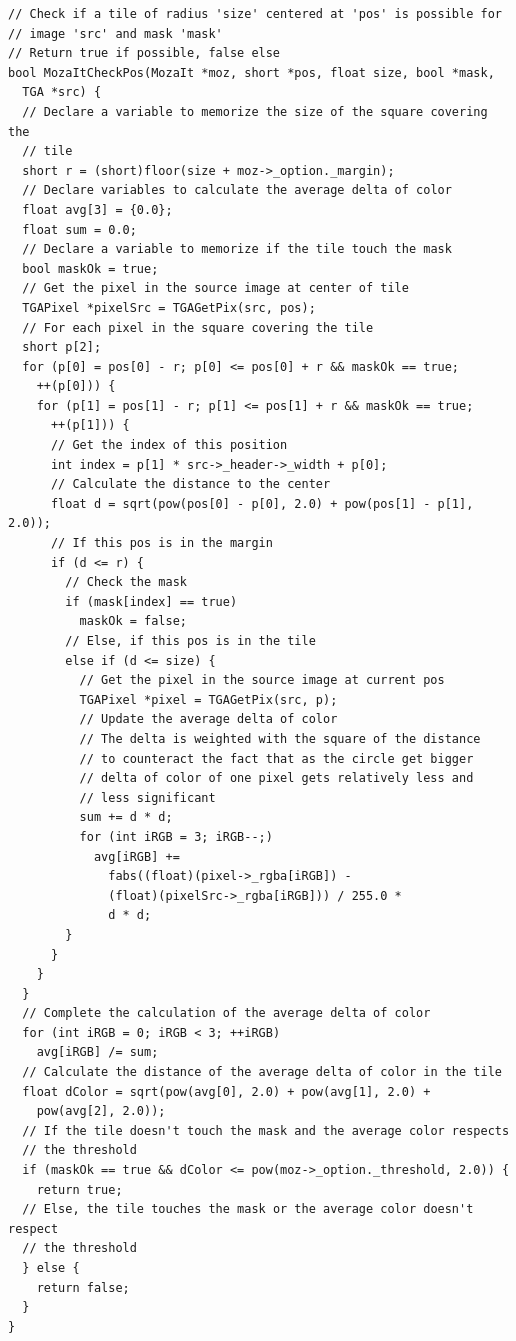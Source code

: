 \documentclass[12pt, a4paper]{article}
\begin{document}
\begin{scriptsize}
\begin{ttfamily}
\begin{lstlisting}
// Check if a tile of radius 'size' centered at 'pos' is possible for 
// image 'src' and mask 'mask'
// Return true if possible, false else
bool MozaItCheckPos(MozaIt *moz, short *pos, float size, bool *mask, 
  TGA *src) { 
  // Declare a variable to memorize the size of the square covering the 
  // tile
  short r = (short)floor(size + moz->_option._margin);
  // Declare variables to calculate the average delta of color
  float avg[3] = {0.0};
  float sum = 0.0;
  // Declare a variable to memorize if the tile touch the mask
  bool maskOk = true;
  // Get the pixel in the source image at center of tile
  TGAPixel *pixelSrc = TGAGetPix(src, pos);
  // For each pixel in the square covering the tile
  short p[2];
  for (p[0] = pos[0] - r; p[0] <= pos[0] + r && maskOk == true; 
    ++(p[0])) {
    for (p[1] = pos[1] - r; p[1] <= pos[1] + r && maskOk == true; 
      ++(p[1])) {
      // Get the index of this position
      int index = p[1] * src->_header->_width + p[0];
      // Calculate the distance to the center
      float d = sqrt(pow(pos[0] - p[0], 2.0) + pow(pos[1] - p[1], 2.0));
      // If this pos is in the margin
      if (d <= r) {
        // Check the mask
        if (mask[index] == true)
          maskOk = false;
        // Else, if this pos is in the tile
        else if (d <= size) {
          // Get the pixel in the source image at current pos
          TGAPixel *pixel = TGAGetPix(src, p);
          // Update the average delta of color
          // The delta is weighted with the square of the distance
          // to counteract the fact that as the circle get bigger 
          // delta of color of one pixel gets relatively less and
          // less significant 
          sum += d * d;
          for (int iRGB = 3; iRGB--;)
            avg[iRGB] += 
              fabs((float)(pixel->_rgba[iRGB]) - 
              (float)(pixelSrc->_rgba[iRGB])) / 255.0 *
              d * d;
        }
      }
    }
  }
  // Complete the calculation of the average delta of color
  for (int iRGB = 0; iRGB < 3; ++iRGB)
    avg[iRGB] /= sum;
  // Calculate the distance of the average delta of color in the tile
  float dColor = sqrt(pow(avg[0], 2.0) + pow(avg[1], 2.0) + 
    pow(avg[2], 2.0));
  // If the tile doesn't touch the mask and the average color respects
  // the threshold
  if (maskOk == true && dColor <= pow(moz->_option._threshold, 2.0)) {
    return true;
  // Else, the tile touches the mask or the average color doesn't respect
  // the threshold
  } else {
    return false;
  }
}


\end{lstlisting}
\end{ttfamily}
\end{scriptsize}
\end{document}
